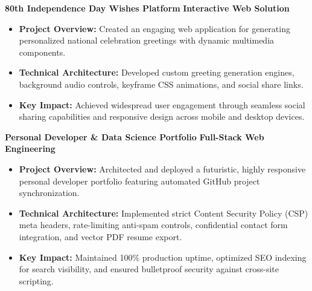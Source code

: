 \documentclass[a4paper,10pt]{article}
\begin{document}
\textbf{80th Independence Day Wishes Platform} \hfill \textbf{Interactive Web Solution}
\begin{itemize}
    \item \textbf{Project Overview:} Created an engaging web application for generating personalized national celebration greetings with dynamic multimedia components.
    \item \textbf{Technical Architecture:} Developed custom greeting generation engines, background audio controls, keyframe CSS animations, and social share links.
    \item \textbf{Key Impact:} Achieved widespread user engagement through seamless social sharing capabilities and responsive design across mobile and desktop devices.
\end{itemize}

\textbf{Personal Developer \& Data Science Portfolio} \hfill \textbf{Full-Stack Web Engineering}
\begin{itemize}
    \item \textbf{Project Overview:} Architected and deployed a futuristic, highly responsive personal developer portfolio featuring automated GitHub project synchronization.
    \item \textbf{Technical Architecture:} Implemented strict Content Security Policy (CSP) meta headers, rate-limiting anti-spam controls, confidential contact form integration, and vector PDF resume export.
    \item \textbf{Key Impact:} Maintained 100\% production uptime, optimized SEO indexing for search visibility, and ensured bulletproof security against cross-site scripting.
\end{itemize}

\end{document}
